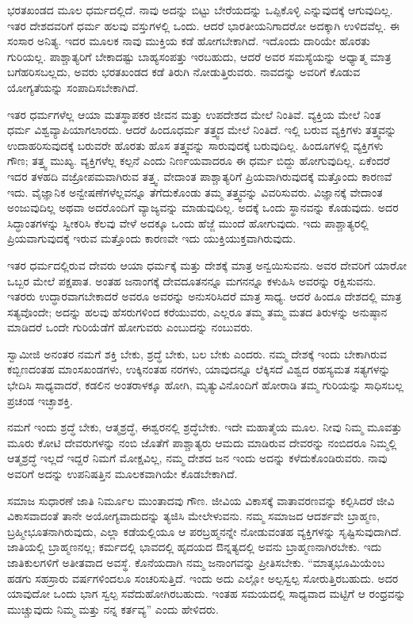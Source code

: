  ಭರತಖಂಡದ ಮೂಲ ಧರ್ಮದಲ್ಲಿದೆ. ನಾವು ಅದನ್ನು ಬಿಟ್ಟು ಬೇರೆಯದನ್ನು ಒಪ್ಪಿಕೊಳ್ಳಿ ಎನ್ನುವುದಕ್ಕೆ ಆಗುವುದಿಲ್ಲ. ಇತರ ದೇಶದವರಿಗೆ ಧರ್ಮ ಹಲವು ವಸ್ತುಗಳಲ್ಲಿ ಒಂದು. ಆದರೆ ಭಾರತೀಯನಿಗಾದರೋ ಅದಕ್ಕಾಗಿ ಉಳಿದವೆಲ್ಲ. ಈ ಸಂಸಾರ ಅನಿತ್ಯ. ಇದರ ಮೂಲಕ ನಾವು ಮುಕ್ತಿಯ ಕಡೆ ಹೋಗಬೇಕಾಗಿದೆ. ಇದೊಂದು ದಾರಿಯೇ ಹೊರತು ಗುರಿಯಲ್ಲ. ಪಾಶ್ಚಾತ್ಯರಿಗೆ ಬೇಕಾದಷ್ಟು ಬಾಹ್ಯಸಂಪತ್ತು ಇರಬಹುದು, ಆದರೆ ಅವರ ಸಮಸ್ಯೆಯನ್ನು ಅಧ್ಯಾತ್ಮ ಮಾತ್ರ ಬಗೆಹರಿಸಬಲ್ಲದು, ಅವರು ಭರತಖಂಡದ ಕಡೆ ತಿರುಗಿ ನೋಡುತ್ತಿರುವರು. ನಾವದನ್ನು ಅವರಿಗೆ ಕೊಡುವ ಯೋಗ್ಯತೆಯನ್ನು ಸಂಪಾದಿಸಬೇಕಾಗಿದೆ. 

 ಇತರ ಧರ್ಮಗಳೆಲ್ಲ ಆಯಾ ಮತಸ್ಥಾಪಕರ ಜೀವನ ಮತ್ತು ಉಪದೇಶದ ಮೇಲೆ ನಿಂತಿವೆ. ವ್ಯಕ್ತಿಯ ಮೇಲೆ ನಿಂತ ಧರ್ಮ ವಿಶ್ವವ್ಯಾಪಿಯಾಗಲಾರದು. ಆದರೆ ಹಿಂದೂಧರ್ಮ ತತ್ತ್ವದ ಮೇಲೆ ನಿಂತಿದೆ. ಇಲ್ಲಿ ಬರುವ ವ್ಯಕ್ತಿಗಳು ತತ್ತ್ವವನ್ನು ಉದಾಹರಿಸುವುದಕ್ಕೆ ಬರುವರೇ ಹೊರತು ಹೊಸ ತತ್ತ್ವವನ್ನು ಸಾರುವುದಕ್ಕೆ ಬರುವುದಿಲ್ಲ. ಹಿಂದೂಗಳಲ್ಲಿ ವ್ಯಕ್ತಿಗಳು ಗೌಣ; ತತ್ತ್ವ ಮುಖ್ಯ. ವ್ಯಕ್ತಿಗಳೆಲ್ಲ ಕಲ್ಪನೆ ಎಂದು ನಿರ್ಣಯವಾದರೂ ಈ ಧರ್ಮ ಬಿದ್ದು ಹೋಗುವುದಿಲ್ಲ. ಏಕೆಂದರೆ ಇದರ ತಳಹದಿ ವಜ್ರೋಪಮವಾಗಿರುವ ತತ್ತ್ವ. ವೇದಾಂತ ಪಾಶ್ಚಾತ್ಯರಿಗೆ ಪ್ರಿಯವಾಗಿರುವುದಕ್ಕೆ ಮತ್ತೊಂದು ಕಾರಣವೆ ಇದು. ವೈಜ್ಞಾನಿಕ ಅನ್ವೇಷಣೆಗಳೆಲ್ಲವನ್ನೂ ತೆಗೆದುಕೊಂಡು ತಮ್ಮ ತತ್ತ್ವವನ್ನು ವಿವರಿಸುವರು. ವಿಜ್ಞಾನಕ್ಕೆ ವೇದಾಂತ ಅಂಜುವುದಿಲ್ಲ ಅಥವಾ ಅದರೊಂದಿಗೆ ವ್ಯಾಜ್ಯವನ್ನು ಮಾಡುವುದಿಲ್ಲ. ಅದಕ್ಕೆ ಒಂದು ಸ್ಥಾನವನ್ನು ಕೊಡುವುದು. ಅದರ ಸಿದ್ಧಾಂತಗಳನ್ನು ಸ್ವೀಕರಿಸಿ ಕೆಲವು ವೇಳೆ ಅದಕ್ಕೂ ಒಂದು ಹೆಜ್ಜೆ ಮುಂದೆ ಹೋಗುವುದು. ಇದು ಪಾಶ್ಚಾತ್ಯರಲ್ಲಿ ಪ್ರಿಯವಾಗುವುದಕ್ಕೆ ಇರುವ ಮತ್ತೊಂದು ಕಾರಣವೇ ಇದು ಯುಕ್ತಿಯುಕ್ತವಾಗಿರುವುದು. 

 ಇತರ ಧರ್ಮದಲ್ಲಿರುವ ದೇವರು ಆಯಾ ಧರ್ಮಕ್ಕೆ ಮತ್ತು ದೇಶಕ್ಕೆ ಮಾತ್ರ ಅನ್ವಯಿಸುವನು. ಅವರ ದೇವರಿಗೆ ಯಾರೋ ಒಬ್ಬರ ಮೇಲೆ ಪಕ್ಷಪಾತ. ಅಂತಹ ಜನಾಂಗಕ್ಕೆ ದೇವದೂತನನ್ನೂ ಮಗನನ್ನೂ ಕಳುಹಿಸಿ ಅವರನ್ನು ರಕ್ಷಿಸುವನು. ಇತರರು ಉದ್ಧಾರವಾಗಬೇಕಾದರೆ ಅವರೂ ಅವರನ್ನು ಅನುಸರಿಸಿದರೆ ಮಾತ್ರ ಸಾಧ್ಯ. ಆದರೆ ಹಿಂದೂ ದೇಶದಲ್ಲಿ ಮಾತ್ರ ಸತ್ಯವೊಂದೇ; ಅದನ್ನು ಹಲವು ಹೆಸರುಗಳಿಂದ ಕರೆಯುವರು, ಎಲ್ಲರೂ ತಮ್ಮ ತಮ್ಮ ಮತದ ತಿರುಳನ್ನು ಅನುಷ್ಠಾನ ಮಾಡಿದರೆ ಒಂದೇ ಗುರಿಯೆಡೆಗೆ ಹೋಗುವರು ಎಂಬುದನ್ನು ನಂಬುವರು. 

\newpage

 ಸ್ವಾಮೀಜಿ ಅನಂತರ ನಮಗೆ ಶಕ್ತಿ ಬೇಕು, ಶ್ರದ್ಧೆ ಬೇಕು, ಬಲ ಬೇಕು ಎಂದರು. ನಮ್ಮ ದೇಶಕ್ಕೆ ಇಂದು ಬೇಕಾಗಿರುವ ಕಬ್ಬಿಣದಂತಹ ಮಾಂಸಖಂಡಗಳು, ಉಕ್ಕಿನಂತಹ ನರಗಳು, ಯಾವುದನ್ನೂ ಲೆಕ್ಕಿಸದೆ ವಿಶ್ವದ ರಹಸ್ಯಮತ ಸತ್ಯಗಳನ್ನು ಭೇದಿಸಿ ಸಾಧ್ಯವಾದರೆ, ಕಡಲಿನ ಅಂತರಾಳಕ್ಕೂ ಹೋಗಿ, ಮೃತ್ಯುವಿನೊಂದಿಗೆ ಹೋರಾಡಿ ತಮ್ಮ ಗುರಿಯನ್ನು ಸಾಧಿಸಬಲ್ಲ ಪ್ರಚಂಡ ಇಚ್ಛಾಶಕ್ತಿ. 

 ನಮಗೆ ಇಂದು ಶ್ರದ್ಧೆ ಬೇಕು, ಆತ್ಮಶ್ರದ್ಧೆ, ಈಶ್ವರನಲ್ಲಿ ಶ್ರದ್ಧೆಬೇಕು. ಇದೇ ಮಹಾತ್ಮೆಯ ಮೂಲ. ನೀವು ನಿಮ್ಮ ಮೂವತ್ತು ಮೂರು ಕೋಟಿ ದೇವರುಗಳನ್ನು ನಂಬಿ ಜೊತೆಗೆ ಪಾಶ್ಚಾತ್ಯರು ಆಮದು ಮಾಡಿರುವ ದೇವರನ್ನು ನಂಬಿದರೂ ನಿಮ್ಮಲ್ಲಿ ಆತ್ಮಶ್ರದ್ಧೆ ಇಲ್ಲದೆ ಇದ್ದರೆ ನಿಮಗೆ ಮೋಕ್ಷವಿಲ್ಲ, ನಮ್ಮ ದೇಶದ ಜನ ಇಂದು ಅದನ್ನು ಕಳೆದುಕೊಂಡಿರುವರು. ನಾವು ಅವರಿಗೆ ಅದನ್ನು ಉಪನಿಷತ್ತಿನ ಮೂಲಕವಾಗಿಯೇ ಕೊಡಬೇಕಾಗಿದೆ. 

 ಸಮಾಜ ಸುಧಾರಣೆ ಜಾತಿ ನಿರ್ಮೂಲ ಮುಂತಾದವು ಗೌಣ. ಜೀವಿಯ ವಿಕಾಸಕ್ಕೆ ವಾತಾವರಣವನ್ನು ಕಲ್ಪಿಸಿದರೆ ಜೀವಿ ವಿಕಾಸವಾದಂತೆ ತಾನೇ ಅಯೋಗ್ಯವಾದುದನ್ನು ತ್ಯಜಿಸಿ ಮೇಲೇಳುವನು. ನಮ್ಮ ಸಮಾಜದ ಆದರ್ಶವೇ ಬ್ರಾಹ್ಮಣ, ಬ್ರಹ್ಮೀಭೂತನಾಗಿರುವುದು, ಎಲ್ಲಾ ಕಡೆಯಲ್ಲಿಯೂ ಆ ಪರಬ್ರಹ್ಮನನ್ನೇ ನೋಡುವಂತಹ ವ್ಯಕ್ತಿಗಳನ್ನು ಸೃಷ್ಟಿಸುವುದಾಗಿದೆ. ಜಾತಿಯಲ್ಲಿ ಬ್ರಾಹ್ಮಣನಲ್ಲ; ಕರ್ಮದಲ್ಲಿ ಭಾವದಲ್ಲಿ ಹೃದಯದ ಔನ್ನತ್ಯದಲ್ಲಿ ಅವನು ಬ್ರಾಹ್ಮಣನಾಗಿರಬೇಕು. ಇದು ಜಾತಿಕುಲಗಳಿಗೆ ಅತೀತವಾದ ಅವಸ್ಥೆ. ಕೊನೆಯದಾಗಿ ನಮ್ಮ ಜನಾಂಗವನ್ನು ಪ್ರೀತಿಸಬೇಕು. “ಮಾತೃಭೂಮಿಯೆಂಬ ಹಡಗು ಸಹಸ್ರಾರು ವರ್ಷಗಳಿಂದಲೂ ಸಂಚರಿಸುತ್ತಿದೆ. ಇಂದು ಅದು ಎಲ್ಲೋ ಅಲ್ಪಸ್ವಲ್ಪ ಸೋರುತ್ತಿರಬಹುದು. ಅದರ ಯಾವುದೋ ಒಂದು ಭಾಗ ಸ್ವಲ್ಪ ಸವೆದುಹೋಗಿರಬಹುದು. ಇಂತಹ ಸಮಯದಲ್ಲಿ ಸಾಧ್ಯವಾದ ಮಟ್ಟಿಗೆ ಆ ರಂಧ್ರವನ್ನು ಮುಚ್ಚುವುದು ನಿಮ್ಮ ಮತ್ತು ನನ್ನ ಕರ್ತವ್ಯ” ಎಂದು ಹೇಳಿದರು. 

